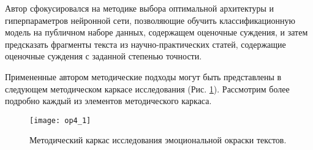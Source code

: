 Автор сфокусировался на методике выбора оптимальной архитектуры и гиперпараметров нейронной сети, позволяющие обучить классификационную модель на публичном наборе данных, содержащем оценочные суждения, и затем предсказать фрагменты текста из научно-практических статей, содержащие оценочные суждения с заданной степенью точности.

Примененные автором методические подходы могут быть представлены в следующем методическом каркасе исследования (Рис. \ref{fig:op4_1}). 
Рассмотрим более подробно каждый из элементов методического каркаса.

\begin{figure}[H]
  \centering
    \texttt{[image: op4\_1]}
  \label{fig:op4_1}
  \caption{ Методический каркас исследования эмоциональной окраски текстов.}
\end{figure}  
